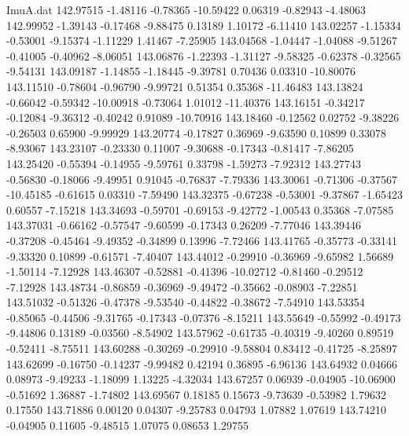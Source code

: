 \begin{filecontents}{ImuA.dat}
 142.97515   -1.48116   -0.78365  -10.59422    0.06319   -0.82943   -4.48063
 142.99952   -1.39143   -0.17468   -9.88475    0.13189    1.10172   -6.11410
 143.02257   -1.15334   -0.53001   -9.15374   -1.11229    1.41467   -7.25905
 143.04568   -1.04447   -1.04088   -9.51267   -0.41005   -0.40962   -8.06051
 143.06876   -1.22393   -1.31127   -9.58325   -0.62378   -0.32565   -9.54131
 143.09187   -1.14855   -1.18445   -9.39781    0.70436    0.03310  -10.80076
 143.11510   -0.78604   -0.96790   -9.99721    0.51354    0.35368  -11.46483
 143.13824   -0.66042   -0.59342  -10.00918   -0.73064    1.01012  -11.40376
 143.16151   -0.34217   -0.12084   -9.36312   -0.40242    0.91089  -10.70916
 143.18460   -0.12562    0.02752   -9.38226   -0.26503    0.65900   -9.99929
 143.20774   -0.17827    0.36969   -9.63590    0.10899    0.33078   -8.93067
 143.23107   -0.23330    0.11007   -9.30688   -0.17343   -0.81417   -7.86205
 143.25420   -0.55394   -0.14955   -9.59761    0.33798   -1.59273   -7.92312
 143.27743   -0.56830   -0.18066   -9.49951    0.91045   -0.76837   -7.79336
 143.30061   -0.71306   -0.37567  -10.45185   -0.61615    0.03310   -7.59490
 143.32375   -0.67238   -0.53001   -9.37867   -1.65423    0.60557   -7.15218
 143.34693   -0.59701   -0.69153   -9.42772   -1.00543    0.35368   -7.07585
 143.37031   -0.66162   -0.57547   -9.60599   -0.17343    0.26209   -7.77046
 143.39446   -0.37208   -0.45464   -9.49352   -0.34899    0.13996   -7.72466
 143.41765   -0.35773   -0.33141   -9.33320    0.10899   -0.61571   -7.40407
 143.44012   -0.29910   -0.36969   -9.65982    1.56689   -1.50114   -7.12928
 143.46307   -0.52881   -0.41396  -10.02712   -0.81460   -0.29512   -7.12928
 143.48734   -0.86859   -0.36969   -9.49472   -0.35662   -0.08903   -7.22851
 143.51032   -0.51326   -0.47378   -9.53540   -0.44822   -0.38672   -7.54910
 143.53354   -0.85065   -0.44506   -9.31765   -0.17343   -0.07376   -8.15211
 143.55649   -0.55992   -0.49173   -9.44806    0.13189   -0.03560   -8.54902
 143.57962   -0.61735   -0.40319   -9.40260    0.89519   -0.52411   -8.75511
 143.60288   -0.30269   -0.29910   -9.58804    0.83412   -0.41725   -8.25897
 143.62699   -0.16750   -0.14237   -9.99482    0.42194    0.36895   -6.96136
 143.64932    0.04666    0.08973   -9.49233   -1.18099    1.13225   -4.32034
 143.67257    0.06939   -0.04905  -10.06900   -0.51692    1.36887   -1.74802
 143.69567    0.18185    0.15673   -9.73639   -0.53982    1.79632    0.17550
 143.71886    0.00120    0.04307   -9.25783    0.04793    1.07882    1.07619
 143.74210   -0.04905    0.11605   -9.48515    1.07075    0.08653    1.29755

\end{filecontents}
